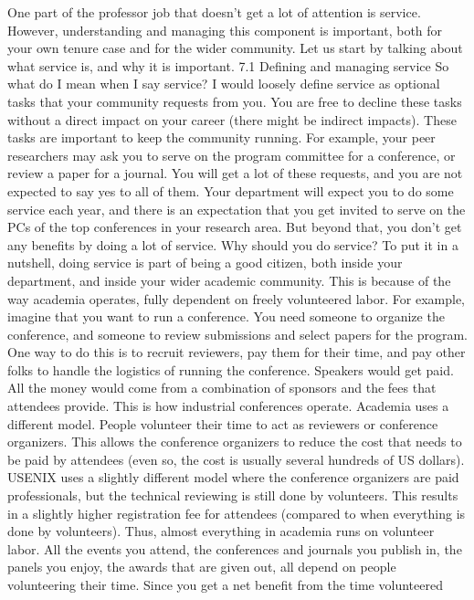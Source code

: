 \documentclass[oneside,11pt]{memoir}
\begin{document}
One part of the professor job that doesn’t get a lot of attention is service. However,
understanding and managing this component is important, both for your own tenure case and
for the wider community. Let us start by talking about what service is, and why it is important.
7.1 Defining and managing service
So what do I mean when I say service? I would loosely define service as optional tasks that your
community requests from you. You are free to decline these tasks without a direct impact on
your career (there might be indirect impacts). These tasks are important to keep the community
running.
For example, your peer researchers may ask you to serve on the program committee for a
conference, or review a paper for a journal. You will get a lot of these requests, and you are not
expected to say yes to all of them. Your department will expect you to do some service each
year, and there is an expectation that you get invited to serve on the PCs of the top conferences
in your research area. But beyond that, you don’t get any benefits by doing a lot of service.
Why should you do service? To put it in a nutshell, doing service is part of being a good citizen,
both inside your department, and inside your wider academic community. This is because of the
way academia operates, fully dependent on freely volunteered labor.
For example, imagine that you want to run a conference. You need someone to organize the
conference, and someone to review submissions and select papers for the program. One way
to do this is to recruit reviewers, pay them for their time, and pay other folks to handle the
logistics of running the conference. Speakers would get paid. All the money would come from a
combination of sponsors and the fees that attendees provide. This is how industrial
conferences operate.
Academia uses a different model. People volunteer their time to act as reviewers or conference
organizers. This allows the conference organizers to reduce the cost that needs to be paid by
attendees (even so, the cost is usually several hundreds of US dollars). USENIX uses a slightly
different model where the conference organizers are paid professionals, but the technical
reviewing is still done by volunteers. This results in a slightly higher registration fee for
attendees (compared to when everything is done by volunteers).
Thus, almost everything in academia runs on volunteer labor. All the events you attend, the
conferences and journals you publish in, the panels you enjoy, the awards that are given out, all
depend on people volunteering their time. Since you get a net benefit from the time volunteered
\end{document}

